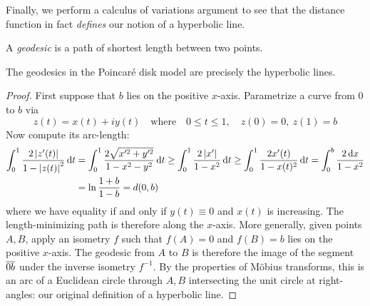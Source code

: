 
Finally, we perform a calculus of variations argument to see that the distance function in fact \emph{defines} our notion of a hyperbolic line.

\begin{defn*}{}{}
A \emph{geodesic} is a path of shortest length between two points.
\end{defn*}

\begin{thm*}{}{}
The geodesics in the Poincaré disk model are precisely the hyperbolic lines.
\end{thm*}

\begin{proof}
First suppose that $b$ lies on the positive $x$-axis. Parametrize a curve from $0$ to $b$ via
\[z(t)=x(t)+iy(t)\quad\text{where}\quad 0\le t\le 1,\quad z(0)=0,\ z(1)=b\]
Now compute its arc-length:
\begin{align*}
\int_{0}^{1}\frac{2\left| z'(t)\right|}{1-\left| z(t)\right|^2}\,{\mathrm{d} t}&=\int_{0}^{1}\frac{2\sqrt{x'^2+y'^2}}{1-x^2-y^2}\,{\mathrm{d} t}\ge \int_{0}^{1}\frac{2\left| x'\right|}{1-x^2}\,{\mathrm{d} t}\ge \int_{0}^{1}\frac{2x'(t)}{1-x(t)^2}\,{\mathrm{d} t} =\int_0^b\frac{2\,{\mathrm{d} x}}{1-x^2}\\
& =\ln\frac{1+b}{1-b}=d(0,b)
\end{align*}
where we have equality if and only if $y(t)\equiv 0$ and $x(t)$ is increasing. The length-minimizing path is therefore along the $x$-axis.\smallbreak
More generally, given points $A,B$, apply an isometry $f$ such that $f(A)=0$ and $f(B)=b$ lies on the positive $x$-axis. The geodesic from $A$ to $B$ is therefore the image of the segment $\overline{0b}$ under the inverse isometry $f^{-1}$. By the properties of Möbius transforms, this is an arc of a Euclidean circle through $A,B$ intersecting the unit circle at right-angles: our original definition of a hyperbolic line.
\end{proof}
